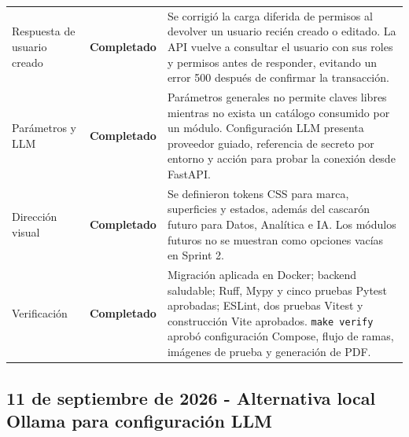 \documentclass[11pt,letterpaper]{article}
\newcommand{\statusok}{\textcolor{deepgreen}{\textbf{Completado}}}
\newcommand{\file}[1]{\texttt{#1}}
\begin{document}
\begin{longtable}{@{}p{}p{}p{}@{}}
  Respuesta de usuario creado & \statusok & Se corrigió la carga diferida de permisos al devolver un usuario recién creado o editado. La API vuelve a consultar el usuario con sus roles y permisos antes de responder, evitando un error 500 después de confirmar la transacción. \\
  Parámetros y LLM & \statusok & Parámetros generales no permite claves libres mientras no exista un catálogo consumido por un módulo. Configuración LLM presenta proveedor guiado, referencia de secreto por entorno y acción para probar la conexión desde FastAPI. \\
  Dirección visual & \statusok & Se definieron tokens CSS para marca, superficies y estados, además del cascarón futuro para Datos, Analítica e IA. Los módulos futuros no se muestran como opciones vacías en Sprint 2. \\
  Verificación & \statusok & Migración aplicada en Docker; backend saludable; Ruff, Mypy y cinco pruebas Pytest aprobadas; ESLint, dos pruebas Vitest y construcción Vite aprobados. \file{make verify} aprobó configuración Compose, flujo de ramas, imágenes de prueba y generación de PDF. \\
  \bottomrule
\end{longtable}

\clearpage
\subsection{11 de septiembre de 2026 - Alternativa local Ollama para configuración LLM}
\end{document}
